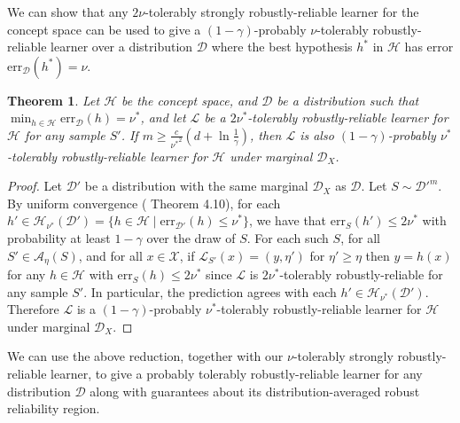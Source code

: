 \documentclass[11pt]{article}
\newcommand{\err}{\mathrm{err}}
\newtheorem{theorem}{Theorem}[section]
\newcommand{\0}{\mathbf{0}}
\newcommand{\1}{\mathbf{1}}
\newcommand{\cA}{\mathcal{A}}
\newcommand{\cD}{\mathcal{D}}
\newcommand{\cH}{\mathcal{H}}
\newcommand{\cL}{\mathcal{L}}
\newcommand{\cX}{\mathcal{X}}
\begin{document}
We can show that any $2\nu$-tolerably strongly robustly-reliable learner for the concept space can be used to give a $(1-\gamma)$-probably $\nu$-tolerably  robustly-reliable learner over a distribution $\cD$ where the best hypothesis $h^*$ in $\cH$ has error $\err_\cD(h^*)=\nu$.

\begin{theorem}\label{thm:agnostic-distribution-reduction}
Let $\cH$ be the concept space, and $\cD$ be a distribution such that $\min_{h\in\cH}\err_\cD(h)=\nu^*$, and let $\cL$ be a $2\nu^*$-tolerably robustly-reliable learner for $\cH$ for any sample $S'$. If $m\ge \frac{c}{{\nu^*}^2}(d+\ln\frac{1}{\gamma})$, then $\cL$ is also $(1-\gamma)$-probably $\nu^*$-tolerably  robustly-reliable learner for $\cH$
under marginal $\cD_X$.
\end{theorem}
\begin{proof}
Let $\cD'$ be a distribution with the same marginal $\cD_X$ as $\cD$. Let $S\sim \cD'^m$.  By uniform convergence (\cite{anthony2009neural} Theorem 4.10), for each $h'\in\cH_{\nu^*}(\cD')= \{h\in \cH\mid \err_{\cD'}(h)\le\nu^*\}$, we have that $\err_{S}(h')\le 2\nu^*$ with probability at least $1-\gamma$ over the draw of $S$. For each such $S$, for all $S'\in\cA_\eta(S)$, and for all $x\in\cX$, if $\cL_{S'}(x)=(y,\eta')$ for $\eta'\geq \eta$ then $y= h(x)$ for any $h\in\cH$ with $\err_S(h)\le 2\nu^*$ since $\cL$ is $2\nu^*$-tolerably  robustly-reliable for any sample $S'$. In particular, the prediction agrees with each $h'\in\cH_{\nu^*}(\cD')$. Therefore $\cL$ is a $(1-\gamma)$-probably $\nu^*$-tolerably  robustly-reliable learner for $\cH$
under marginal $\cD_X$.
\end{proof}



We can use the above reduction, together with our $\nu$-tolerably strongly robustly-reliable learner, to give a probably tolerably robustly-reliable learner for any distribution $\cD$ along with guarantees about its distribution-averaged robust reliability region.
\end{document}
